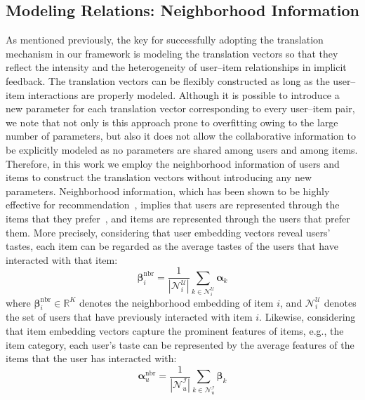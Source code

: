 \documentclass[conference]{IEEEtran}
\begin{document}
\subsection{Modeling Relations: Neighborhood Information}
\label{met:Neighbor}
As mentioned previously, the key for successfully adopting the translation mechanism in our framework is modeling the translation vectors so that they reflect the
intensity and the heterogeneity of user--item relationships in implicit feedback.
The translation vectors can be flexibly constructed as long as the user--item interactions are properly modeled.
Although it is possible to introduce a new parameter for each translation vector corresponding to every user--item pair, we note that not only is this approach prone to overfitting owing to the large number of parameters, but also it does not allow the collaborative information to be explicitly modeled as no parameters are shared among users and among items.
Therefore, in this work we employ the neighborhood information of users and items to construct the translation vectors without introducing any new parameters.
Neighborhood information, which has been shown to be highly effective for recommendation~\cite{wu2016collaborative,ning2011slim,desrosiers2011comprehensive,sarwar2001item}, implies that users are represented through the items that they prefer~\cite{koren2008factorization,kabbur2013fism}, and items are represented through the users that prefer them.
More precisely, considering that user embedding vectors reveal users' tastes, each item can be regarded as the average tastes of the users that have interacted with that item:
\begin{equation}
\label{eqn:itemnbr}
	\bm{\beta}_i^{\mathrm{nbr}}={\frac{1}{{|\mathcal{N}_i^\mathcal{U}|}}\sum\limits_{k \in \mathcal{N}_i^\mathcal{U}} {{\bm{\alpha}_k}} }
\end{equation}
where $\bm{\beta}_i^{\mathrm{nbr}}\in\mathbb{R}^K$ denotes the neighborhood embedding of item $i$, and $\mathcal{N}^\mathcal{U}_i$ denotes the set of users that have previously interacted with item $i$. 
Likewise, considering that item embedding vectors capture the prominent features of items, e.g., the item category, each user's taste can be represented by the average features of the items that the user has interacted with: 
\begin{equation}
\label{eqn:usernbr}
	\bm{\alpha}_u^{\mathrm{nbr}}={\frac{1}{{|\mathcal{N}_u^\mathcal{I}|}}\sum\limits_{k \in \mathcal{N}_u^\mathcal{I}} {{\bm{\beta} _k}} }
\end{equation}
\end{document}
